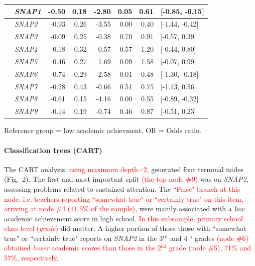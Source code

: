 \documentclass[10pt,letterpaper]{article}
\begin{document}
{{\begin{table}[H]
\begin{tabular}{|llrrrr|rl}
 \hline
  &  {\it SNAP1} & -0.50 & 0.18 & -2.80 & 0.05 & 0.61 & [-0.85, -0.15] \\ 
  \hline
  &  {\it SNAP2} & -0.93 & 0.26 & -3.55 & 0.00 & 0.40 & [-1.44, -0.42] \\ 
  \hline
  &  {\it SNAP3} & -0.09 & 0.25 & -0.38 & 0.70 & 0.91 & [-0.57, 0.39] \\ 
  \hline
  &  {\it SNAP4} & 0.18 & 0.32 & 0.57& 0.57 & 1.20 & [-0.44, 0.80] \\ 
  \hline
  &  {\it SNAP5} & 0.46 & 0.27 & 1.69 & 0.09 & 1.58 & [-0.07, 0.99] \\ 
  \hline 
  &  {\it SNAP6} & -0.74 & 0.29 & -2.58 & 0.01 & 0.48 & [-1.30, -0.18] \\ 
   \hline
  &  {\it SNAP7} & -0.28 & 0.43 & -0.66 & 0.51 & 0.75 & [-1.13, 0.56] \\ 
  \hline
  &  {\it SNAP8} & -0.61 & 0.15 & -4.16 & 0.00 & 0.55 & [-0.89, -0.32] \\ 
  \hline
  &  {\it SNAP9} & -0.14 & 0.19 & -0.74 & 0.46 & 0.87 & [-0.51, 0.23] \\ 
   \hline

\end{tabular}
\begin{center}
Reference group = low academic achievment. OR = Odds ratio.\\ 
\end{center}
\end{table}
\vspace{5mm}


\paragraph{Classification trees (CART)}

 The CART analysis, \textcolor{red}{using  maximum depth=$2$},  generated four terminal nodes (Fig.~2). 
 The first and most important split \textcolor{red}{(the top node \#0)} was on {\it SNAP2}, 
 assessing problems related to sustained attention. The \textcolor{red}{``False" branch at this node, i.e. teachers reporting ``somewhat true" or ``certainly true" on this item, 
 arriving at node \#4  ($11.5$\% of the sample),} were 
 mainly associated with a {\it low} academic achievement score in high school. 
 \textcolor{red}{In this subsample, primary school class level ({\it grade})} did matter. 
 A higher portion of those those with ``somewhat true" or ``certainly true" 
 reports on {\it SNAP2} in the 3$^{\text{rd}}$ and 4$^{\text{th}}$ grades  \textcolor{red}{(node \#6) obtained {\it lower} academic scores than those in 
 the 2$^{\text{nd}}$ grade (node \#5), 71\% and 57\%, respectively}. 

}}
\end{document}

